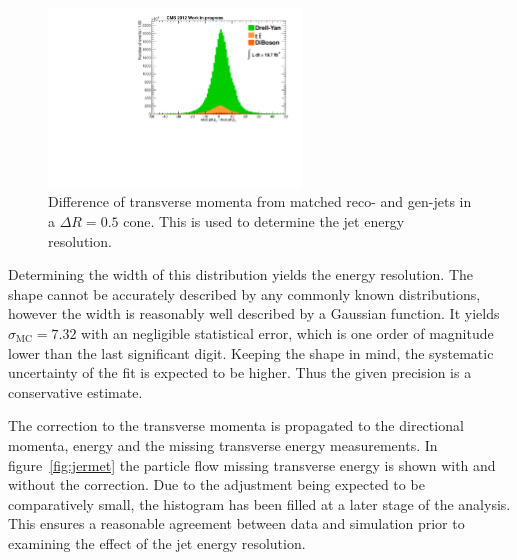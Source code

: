 \begin{itemize}
  \begin{figure}[htb!]
    \centering
    \includegraphics[width=0.6\textwidth]{plots/jer_deltapt.pdf}
    \caption{Difference of transverse momenta from matched reco- and gen-jets in a $\Delta R = 0.5$ cone. This is used to determine the jet energy resolution.}
    \label{fig:jerdeltapt}
  \end{figure}
 
  \noindent Determining the width of this distribution yields the energy resolution. The shape cannot be accurately described by any commonly known distributions, however the width is reasonably well described by a Gaussian function. It yields $\sigma_{\text{MC}} = 7.32$ with an negligible statistical error, which is one order of magnitude lower than the last significant digit. Keeping the shape in mind, the systematic uncertainty of the fit is expected to be higher. Thus the given precision is a conservative estimate.
\end{itemize}

The correction to the transverse momenta is propagated to the directional momenta, energy and the missing transverse energy measurements. In figure~\ref{fig:jermet} the particle flow missing transverse energy is shown with and without the correction. Due to the adjustment being expected to be comparatively small, the histogram has been filled at a later stage of the analysis. This ensures a reasonable agreement between data and simulation prior to examining the effect of the jet energy resolution.

